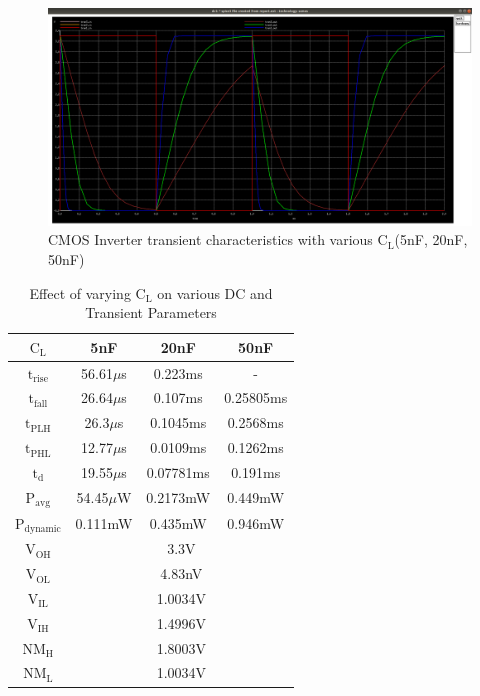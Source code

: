 \documentclass[12pt]{article}
\begin{document}
	\begin{figure}[H]
		\begin{center}
			\includegraphics[scale = 0.2]{images/layout_tran_cl.png}
			\caption{CMOS Inverter transient characteristics with various $\text{C}_\text{L}$(5nF, 20nF, 50nF)}
			\label{fig::layout_tran}
		\end{center}
	\end{figure}
	\begin{table}[H]
		\begin{center}
			\begin{tabular}{|c|c|c|c|}
				\hline 
				\rule[-1ex]{0pt}{2.5ex} $\text{C}_\text{L}$ & 5nF & 20nF & 50nF \\ 
				\hline 
				\rule[-1ex]{0pt}{2.5ex}
				$\text{t}_\text{rise}$ & 56.61$\mu$s & 0.223ms & - \\ 
				$\text{t}_\text{fall}$ & 26.64$\mu$s & 0.107ms & 0.25805ms \\ 
				$\text{t}_\text{PLH}$ & 26.3$\mu$s & 0.1045ms & 0.2568ms \\ 
				$\text{t}_\text{PHL}$ & 12.77$\mu$s & 0.0109ms & 0.1262ms \\ 
				$\text{t}_\text{d}$ & 19.55$\mu$s & 0.07781ms & 0.191ms \\ 
				$\text{P}_\text{avg}$ & 54.45$\mu$W  & 0.2173mW & 0.449mW \\ 
				$\text{P}_\text{dynamic}$ & 0.111mW  & 0.435mW & 0.946mW \\ 
				\hline $\text{V}_\text{OH}$ &\multicolumn{3}{|c|}{3.3V}\\ 
				$\text{V}_\text{OL}$ & \multicolumn{3}{|c|}{4.83nV} \\ 
				$\text{V}_\text{IL}$ & \multicolumn{3}{|c|}{1.0034V} \\ 
				$\text{V}_\text{IH}$ & \multicolumn{3}{|c|}{1.4996V} \\ 
				$\text{NM}_\text{H}$ & \multicolumn{3}{|c|}{1.8003V} \\ 
				$\text{NM}_\text{L}$ & \multicolumn{3}{|c|}{1.0034V}\\ 
				\hline 
			\end{tabular} 
		\end{center}
		\caption{Effect of varying $\text{C}_\text{L}$ on various DC and Transient Parameters}
		\label{table::tablevarycllayout}
	\end{table}
	
\end{document}

